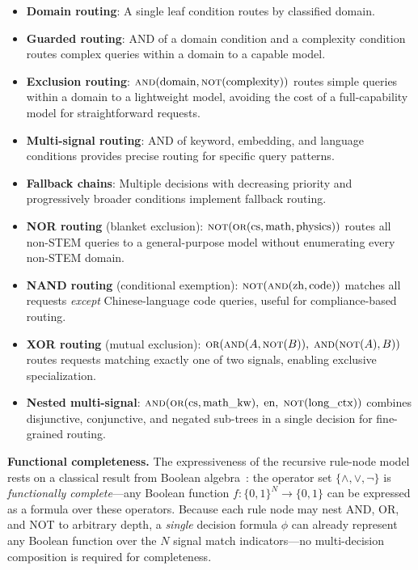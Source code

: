 \begin{itemize}[leftmargin=*]
  \item \textbf{Domain routing}: A single leaf condition routes by classified domain.
  \item \textbf{Guarded routing}: AND of a domain condition and a complexity condition routes complex queries within a domain to a capable model.
  \item \textbf{Exclusion routing}: $\textsc{and}(\text{domain}, \textsc{not}(\text{complexity}))$ routes simple queries within a domain to a lightweight model, avoiding the cost of a full-capability model for straightforward requests.
  \item \textbf{Multi-signal routing}: AND of keyword, embedding, and language conditions provides precise routing for specific query patterns.
  \item \textbf{Fallback chains}: Multiple decisions with decreasing priority and progressively broader conditions implement fallback routing.
  \item \textbf{NOR routing} (blanket exclusion): $\textsc{not}(\textsc{or}(\text{cs}, \text{math}, \text{physics}))$ routes all non-STEM queries to a general-purpose model without enumerating every non-STEM domain.
  \item \textbf{NAND routing} (conditional exemption): $\textsc{not}(\textsc{and}(\text{zh}, \text{code}))$ matches all requests \emph{except} Chinese-language code queries, useful for compliance-based routing.
  \item \textbf{XOR routing} (mutual exclusion): $\textsc{or}(\textsc{and}(A, \textsc{not}(B)),\; \textsc{and}(\textsc{not}(A), B))$ routes requests matching exactly one of two signals, enabling exclusive specialization.
  \item \textbf{Nested multi-signal}: $\textsc{and}(\textsc{or}(\text{cs}, \text{math\_kw}),\; \text{en},\; \textsc{not}(\text{long\_ctx}))$ combines disjunctive, conjunctive, and negated sub-trees in a single decision for fine-grained routing.
\end{itemize}

\noindent\textbf{Functional completeness.}
The expressiveness of the recursive rule-node model rests on a classical result from Boolean algebra~\cite{huntington1904sets}: the operator set $\{\wedge, \vee, \neg\}$ is \emph{functionally complete}---any Boolean function $f: \{0,1\}^N \to \{0,1\}$ can be expressed as a formula over these operators.
Because each rule node may nest AND, OR, and NOT to arbitrary depth, a \emph{single} decision formula $\phi$ can already represent any Boolean function over the $N$ signal match indicators---no multi-decision composition is required for completeness.

